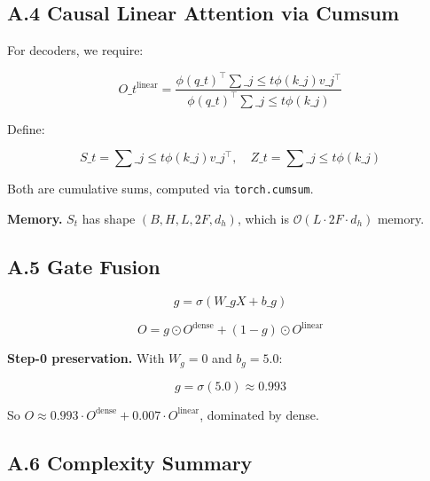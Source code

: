 \subsection{A.4 Causal Linear Attention via Cumsum}

For decoders, we require:

\[
O\_t^\text{linear} = \frac{\phi(q\_t)^\top \sum\_{j \leq t} \phi(k\_j) v\_j^\top}{\phi(q\_t)^\top \sum\_{j \leq t} \phi(k\_j)}
\]

Define:

\[
S\_t = \sum\_{j \leq t} \phi(k\_j) v\_j^\top, \quad
Z\_t = \sum\_{j \leq t} \phi(k\_j)
\]

Both are cumulative sums, computed via \texttt{torch.cumsum}.

\textbf{Memory.} $S_t$ has shape $(B, H, L, 2F, d_h)$, which is 
$\mathcal{O}(L \cdot 2F \cdot d_h)$ memory.

\subsection{A.5 Gate Fusion}

\[
g = \sigma(W\_g X + b\_g)
\]

\[
O = g \odot O^\text{dense} + (1 - g) \odot O^\text{linear}
\]

\textbf{Step-0 preservation.} With $W_g = 0$ and $b_g = 5.0$:

\[
g = \sigma(5.0) \approx 0.993
\]

So $O \approx 0.993 \cdot O^\text{dense} + 0.007 \cdot O^\text{linear}$, 
dominated by dense.

\subsection{A.6 Complexity Summary}

